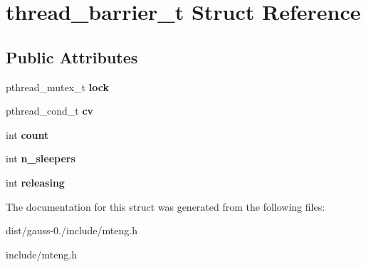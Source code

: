\hypertarget{structthread__barrier__t}{\section{thread\-\_\-barrier\-\_\-t Struct Reference}
\label{structthread__barrier__t}
}
\subsection*{Public Attributes}
\begin{DoxyCompactItemize}
\item 
\hypertarget{structthread__barrier__t_a92fffd914b545656eae85e2c5b063131}{pthread\-\_\-mutex\-\_\-t {\bfseries lock}}\label{structthread__barrier__t_a92fffd914b545656eae85e2c5b063131}

\item 
\hypertarget{structthread__barrier__t_a88d6012a0452f7d3224f4058ef223c62}{pthread\-\_\-cond\-\_\-t {\bfseries cv}}\label{structthread__barrier__t_a88d6012a0452f7d3224f4058ef223c62}

\item 
\hypertarget{structthread__barrier__t_ac2289b8a0c59b4e4eedf0ec4829b82c3}{int {\bfseries count}}\label{structthread__barrier__t_ac2289b8a0c59b4e4eedf0ec4829b82c3}

\item 
\hypertarget{structthread__barrier__t_a38e3d22bf2fc8a32fe2903de673ad3f5}{int {\bfseries n\-\_\-sleepers}}\label{structthread__barrier__t_a38e3d22bf2fc8a32fe2903de673ad3f5}

\item 
\hypertarget{structthread__barrier__t_aa9dd95c544025e32acbd0979f76ecd25}{int {\bfseries releasing}}\label{structthread__barrier__t_aa9dd95c544025e32acbd0979f76ecd25}

\end{DoxyCompactItemize}


The documentation for this struct was generated from the following files\-:\begin{DoxyCompactItemize}
\item 
dist/gauss-\/0./include/mteng.\-h\item 
include/mteng.\-h\end{DoxyCompactItemize}
